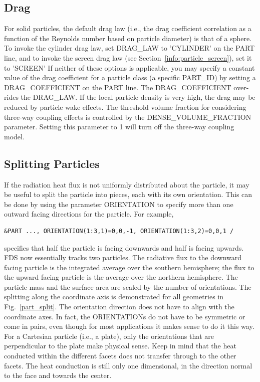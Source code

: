 \documentclass[11pt]{book}
\begin{document}
\subsection{Drag}
\label{info:particle_drag}

For solid particles, the default drag law (i.e., the drag coefficient correlation as a function of the Reynolds number based on particle diameter) is that of a sphere. To invoke the cylinder drag law, set {\ct DRAG\_LAW} to {\ct 'CYLINDER'} on the {\ct PART} line, and to invoke the screen drag law (see Section~\ref{info:particle_screen}), set it to {\ct 'SCREEN'}  If neither of these options is applicable, you may specify a constant value of the drag coefficient for a particle class (a specific {\ct PART\_ID}) by setting a {\ct DRAG\_COEFFICIENT} on the {\ct PART} line. The {\ct DRAG\_COEFFICIENT} over-rides the {\ct DRAG\_LAW}. If the local particle density is very high, the drag may be reduced by particle wake effects. The threshold volume fraction for considering three-way coupling effects is controlled by the {\ct DENSE\_VOLUME\_FRACTION} parameter. Setting this parameter to 1 will turn off the three-way coupling model.

\subsection{Splitting Particles}
\label{info:particle_split}

If the radiation heat flux is not uniformly distributed about the particle, it may be useful to split the particle into pieces, each with its own orientation. This can be done by using the parameter {\ct ORIENTATION} to specify  more than one outward facing directions for the particle. For example,
\begin{lstlisting}
&PART ..., ORIENTATION(1:3,1)=0,0,-1, ORIENTATION(1:3,2)=0,0,1 /
\end{lstlisting}
specifies that half the particle is facing downwards and half is facing upwards. FDS now essentially tracks two particles. The radiative flux to the downward facing particle is the integrated average over the southern hemisphere; the flux to the upward facing particle is the average over the northern hemisphere. The particle mass and the surface area are scaled by the number of orientations. The splitting along the coordinate axis is demonstrated for all geometries in Fig.~\ref{part_split}. The orientation direction does not have to align with the coordinate axes. In fact, the {\ct ORIENTATION}s do not have to be symmetric or come in pairs, even though for most applications it makes sense to do it this way. For a Cartesian particle (i.e., a plate), only the orientations that are perpendicular to the plate make physical sense. Keep in mind that the heat conducted within the different facets does not transfer through to the other facets. The heat conduction is still only one dimensional, in the direction normal to the face and towards the center.
\end{document}
